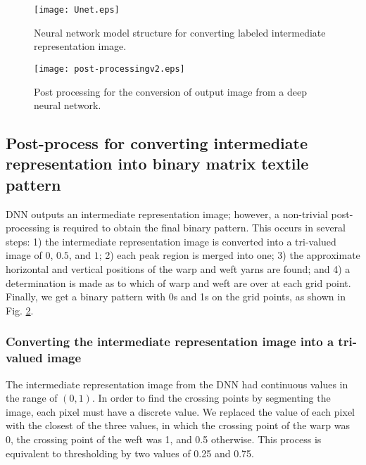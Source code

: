 \begin{figure}[ht]
\centering
\texttt{[image: Unet.eps]}
\caption{Neural network model structure for converting labeled intermediate representation image.}
\label{fig:network}
\end{figure}

\begin{figure}[ht]
\centering
\texttt{[image: post-processingv2.eps]}
\caption{Post processing for the conversion of output image from a deep neural network.}
\label{fig:transition}
\end{figure}

\subsection{Post-process for converting intermediate representation into binary matrix textile pattern}
DNN outputs an intermediate representation image; however, a non-trivial post-processing is required to obtain the final binary pattern. This occurs in several steps: 1) the intermediate representation image is converted into a tri-valued image of $0$, $0.5$, and $1$; 2) each peak region is merged into one; 3) the approximate horizontal and vertical positions of the warp and weft yarns are found; and 4) a determination is made as to which of warp and weft are over at each grid point. Finally, we get a binary pattern with 0s and 1s on the grid points, as shown in Fig. \ref{fig:transition}. 

\vspace{0.2cm}


\subsubsection{Converting the intermediate representation image into a tri-valued image}
The intermediate representation image   from the DNN had continuous values in the range of $(0,1)$. In order to find the crossing points by segmenting the image, each pixel must have a discrete value. We replaced the value of each pixel with the closest of the three values, in which the crossing point of the warp was 0, the crossing point of the weft was 1, and 0.5 otherwise. This process is equivalent to thresholding by two values of 0.25 and 0.75. 


